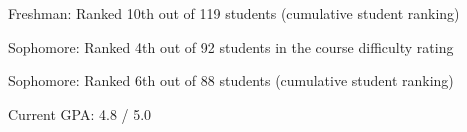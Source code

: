 

\begin{cventries}

\cventry
{} 
{}
{}
{} 
{
 \begin{cvitems}
\item {Freshman: Ranked 10th out of 119 students (cumulative student ranking)}
\item {Sophomore: Ranked 4th out of 92 students in the course difficulty rating}
\item {Sophomore: Ranked 6th out of 88 students (cumulative student ranking)}
\item {Current GPA: 4.8 / 5.0}
 \end{cvitems}
}

\end{cventries}